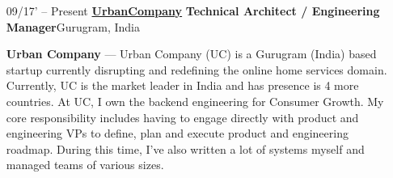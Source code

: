 \documentclass{article}
\begin{document}
\begin{itemize}[leftmargin=-1ex] \setlength\itemsep{0.25em}\vspace{5pt}
	
	
	\item[09/17' – Present] \href{https://urbanclap.com/}{\textbf{UrbanCompany}} \textbf{Technical Architect / Engineering Manager}\hfill Gurugram, India
	
	\item[]  \textbf{Urban Company} --- Urban Company (UC) is a Gurugram (India) based startup currently disrupting and redefining the online home services domain. Currently, UC is the market leader in India and has presence is 4 more countries. At UC, I own the backend engineering for Consumer Growth. My core responsibility includes having to engage directly with product and engineering VPs to define, plan and execute product and engineering roadmap. During this time, I've also written a lot of systems myself and managed teams of various sizes. \vspace{5pt}

	\begin{itemize} \setlength\itemsep{0.5em}
		

\end{itemize}
\end{itemize}
\end{document}

